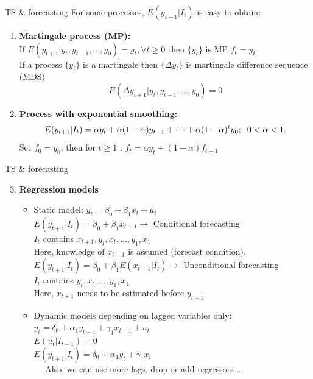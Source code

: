 \documentclass{beamer}
\begin{document}
\begin{frame}{TS \& forecasting}
For some processes, $E(y_{t+1}|I_t)$ is easy to obtain:
\begin{enumerate}
\item \textbf{Martingale process (MP):}\\
If $E(y_{t+1}|y_{t},y_{t-1},\dots,y_{0})=y_t, \forall t \geq 0$ then $\{y_t\}$ is MP $f_t=y_t$\\
If a process $\{y_t\}$ is a martingale then $\{\Delta y_t\}$ is martingale difference sequence (MDS) 
$$ E(\Delta y_{t+1}|y_{t},y_{t-1},\dots,y_{0})=0$$
\medskip
\item \textbf{Process with exponential smoothing:}
$$E(y_{t+1}|I_t)=\alpha y_t + \alpha (1- \alpha) y_{t-1}+ \dots + \alpha(1-\alpha)^ty_0; 
\hspace{0.2cm} 0 < \alpha < 1.$$
Set $f_0=y_0$, then for $t\geq 1$ : $f_t = \alpha y_t + (1-\alpha)f_{t-1}$
\end{enumerate}
\end{frame}
\begin{frame}{TS \& forecasting}
\begin{enumerate}
\setcounter{enumi}{2}
\item \textbf{Regression models}
\begin{itemize}
\item Static model: $y_t=\beta_0 + \beta_1 x_t + u_t$\\
$E(y_{t+1}|I_t)=\beta_0 + \beta_1 x_{t+1} \rightarrow$ Conditional forecasting\\
$I_t$ contains $x_{t+1}, y_t, x_t,\dots, y_1, x_1$\\
Here, knowledge of $x_{t+1}$ is assumed (forecast condition).\\
\medskip
$E(y_{t+1}|I_t)=\beta_0 + \beta_1 E(x_{t+1}|I_t) \rightarrow$ Unconditional forecasting\\
$I_t$ contains $y_t, x_t,\dots, y_1, x_1$\\
Here, $x_{t+1}$ needs to be estimated before $y_{t+1}$\\
\vspace{0.5cm}
\item Dynamic models depending on lagged variables only:\\
$y_t=\delta_0+\alpha_1 y_{t-1} + \gamma_1 x_{t-1} + u_t$\\
$E(u_t|I_{t-1})=0$\\
$E(y_{t+1}|I_t)=\delta_0+\alpha_1 y_{t} + \gamma_1 x_{t}$\\
~~ Also, we can use more lags, drop or add regressors \dots 
\end{itemize}
\end{enumerate}
\end{frame}
\end{document}
